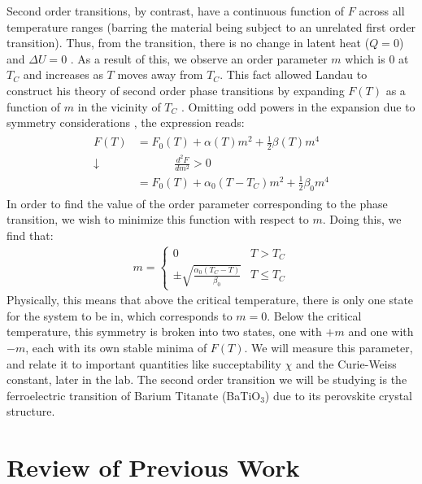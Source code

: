 \documentclass[%
 reprint,
 amsmath,amssymb,
 aps,
 pra,
]{revtex4-1}
\begin{document}
Second order transitions, by contrast, have a continuous function of $F$ across all temperature ranges (barring the material being subject to an unrelated first order transition). Thus, from the transition, there is no change in latent heat ($Q = 0$) and $\Delta U = 0$ \cite{manual}. As a result of this, we observe an order parameter $m$ which is $0$ at $T_C$ and increases as $T$ moves away from $T_C$. This fact allowed Landau to construct his theory of second order phase transitions by expanding $F(T)$ as a function of $m$ in the vicinity of $T_C$ \cite{manual, phase_1}. Omitting odd powers in the expansion due to symmetry considerations \cite{manual}, the expression reads:
\begin{gather}
	\begin{align}
	F\left(T\right) 	& = F_0\left(T\right)+\alpha(T) m^2+\frac{1}{2}\beta(T) m^4 \nonumber \\
	\downarrow 		& ~~~~~~~~~~~~~~~ \frac{d^2F}{dm^2} > 0 \nonumber \\
					& =F_0\left(T\right)+\alpha_0(T - T_C) m^2+\frac{1}{2}\beta_0 m^4 \nonumber
	\end{align}
\end{gather}
In order to find the value of the order parameter corresponding to the phase transition, we wish to minimize this function with respect to $m$. Doing this, we find that:
\begin{gather}
	m = 	\begin{cases}
			0 & T > T_C \\
			\pm \sqrt{\frac{\alpha_0 (T_C - T)}{\beta_0}} & T \le T_C
		\end{cases} \nonumber
\end{gather}
Physically, this means that above the critical temperature, there is only one state for the system to be in, which corresponds to $m = 0$. Below the critical temperature, this symmetry is broken into two states, one with $+m$ and one with $-m$, each with its own stable minima of $F(T)$. We will measure this parameter, and relate it to important quantities like succeptability $\chi$ and the Curie-Weiss constant, later in the lab. The second order transition we will be studying is the ferroelectric transition of Barium Titanate (BaTiO$_3$) due to its perovskite crystal structure.

\section{Review of Previous Work}
\end{document}
